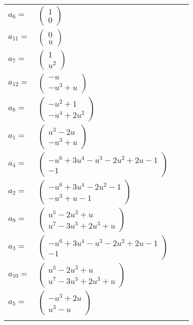 \documentclass[1p]{elsarticle_modified}
\theoremstyle{definition}
\begin{document}
\begin{tabular}{m{7pt} m{180pt} m{7pt} m{180pt} }
\flushright $a_{6}=$&$\begin{pmatrix}1\\0\end{pmatrix}$ \\
\flushright $a_{11}=$&$\begin{pmatrix}0\\u\end{pmatrix}$ \\
\flushright $a_{7}=$&$\begin{pmatrix}1\\u^2\end{pmatrix}$ \\
\flushright $a_{12}=$&$\begin{pmatrix}- u\\- u^3+u\end{pmatrix}$ \\
\flushright $a_{8}=$&$\begin{pmatrix}- u^2+1\\- u^4+2 u^2\end{pmatrix}$ \\
\flushright $a_{1}=$&$\begin{pmatrix}u^3-2 u\\- u^3+u\end{pmatrix}$ \\
\flushright $a_{4}=$&$\begin{pmatrix}- u^6+3 u^4- u^3-2 u^2+2 u-1\\-1\end{pmatrix}$ \\
\flushright $a_{2}=$&$\begin{pmatrix}- u^6+3 u^4-2 u^2-1\\- u^3+u-1\end{pmatrix}$ \\
\flushright $a_{9}=$&$\begin{pmatrix}u^5-2 u^3+u\\u^7-3 u^5+2 u^3+u\end{pmatrix}$ \\
\flushright $a_{3}=$&$\begin{pmatrix}- u^6+3 u^4- u^3-2 u^2+2 u-1\\-1\end{pmatrix}$ \\
\flushright $a_{10}=$&$\begin{pmatrix}u^5-2 u^3+u\\u^7-3 u^5+2 u^3+u\end{pmatrix}$ \\
\flushright $a_{5}=$&$\begin{pmatrix}- u^3+2 u\\u^3- u\end{pmatrix}$\\&\end{tabular}
\end{document}
